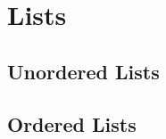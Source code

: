 	
	\section{Lists}
	\label{Lists}


        \subsection{Unordered Lists}
        \label{Unordered Lists}
        
        
%
%
% 
%    
%
%


        \subsection{Ordered Lists}
        \label{Ordered Lists}
        
